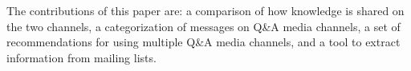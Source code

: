 \documentclass{sig-alternate-05-2015}
\begin{document}
	The contributions of this paper are:
	    a comparison of how knowledge is shared on the two channels,
		a categorization of messages on Q\&A media channels,
        a set of recommendations for using multiple Q\&A media channels,
		and a tool to extract information from mailing lists.


\end{document}
